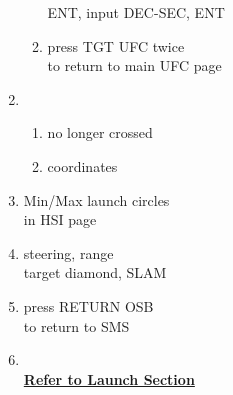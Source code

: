 \documentclass[fontHelvetica, widesubsec]{TechCheck}
\begin{document}
\begin{enumerate}
\begin{enumerate}
			\hfill ENT, input DEC-SEC, ENT
			\item {}\dotfill press TGT UFC twice\\
			\hfill  to return to main UFC page
		\end{enumerate}
		\item {}
		\begin{enumerate}
			\item {}\dotfill no longer crossed
			\item {}\dotfill coordinates
		\end{enumerate}
		\item {}\dotfill Min/Max launch circles\\
		\hfill in HSI page
		\item {}\dotfill steering, range \\
		\hfill  target diamond, SLAM
		\item {}\dotfill press RETURN OSB \\
		\hfill to return to SMS
		\item {} \\
		\hfill \hyperref[subsec:84launch]{\textbf{Refer to Launch Section}}
	\end{enumerate}
\end{document}
